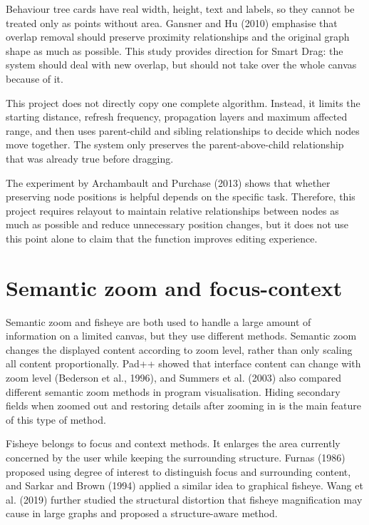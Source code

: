 \documentclass[11pt,a4paper,oneside,extrafontsizes]{memoir}
\begin{document}
Behaviour tree cards have real width, height, text and labels, so they cannot be treated only as points without area. Gansner and Hu (2010) emphasise that overlap removal should preserve proximity relationships and the original graph shape as much as possible. This study provides direction for Smart Drag: the system should deal with new overlap, but should not take over the whole canvas because of it.

This project does not directly copy one complete algorithm. Instead, it limits the starting distance, refresh frequency, propagation layers and maximum affected range, and then uses parent-child and sibling relationships to decide which nodes move together. The system only preserves the parent-above-child relationship that was already true before dragging.

The experiment by Archambault and Purchase (2013) shows that whether preserving node positions is helpful depends on the specific task. Therefore, this project requires relayout to maintain relative relationships between nodes as much as possible and reduce unnecessary position changes, but it does not use this point alone to claim that the function improves editing experience.

\section{Semantic zoom and focus-context}

Semantic zoom and fisheye are both used to handle a large amount of information on a limited canvas, but they use different methods. Semantic zoom changes the displayed content according to zoom level, rather than only scaling all content proportionally. Pad++ showed that interface content can change with zoom level (Bederson et al., 1996), and Summers et al. (2003) also compared different semantic zoom methods in program visualisation. Hiding secondary fields when zoomed out and restoring details after zooming in is the main feature of this type of method.

Fisheye belongs to focus and context methods. It enlarges the area currently concerned by the user while keeping the surrounding structure. Furnas (1986) proposed using degree of interest to distinguish focus and surrounding content, and Sarkar and Brown (1994) applied a similar idea to graphical fisheye. Wang et al. (2019) further studied the structural distortion that fisheye magnification may cause in large graphs and proposed a structure-aware method.
\end{document}

